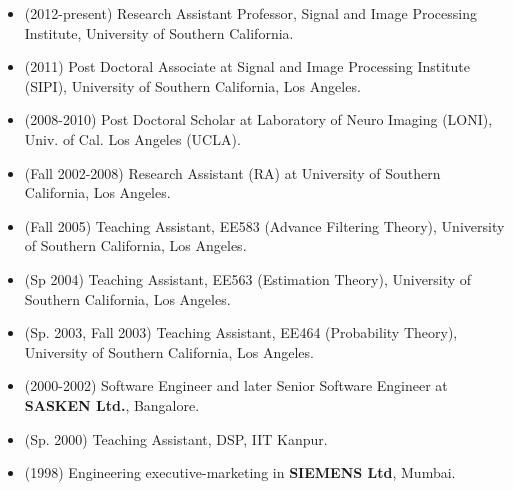 \documentclass[overlapped,line,letterpaper]{res}
\begin{document}
\begin{resume}
\begin{itemize}
\item (2012-present) Research Assistant Professor, Signal and Image Processing Institute, University of Southern California. 
\item (2011) Post Doctoral Associate at Signal and Image Processing Institute (SIPI), University of Southern California, Los Angeles.
\item (2008-2010) Post Doctoral Scholar at Laboratory of Neuro Imaging (LONI), Univ. of Cal. Los Angeles (UCLA).
\item (Fall 2002-2008) Research Assistant (RA) at University of Southern California, Los Angeles.
\item (Fall 2005) Teaching Assistant, EE583 (Advance Filtering Theory), University of Southern California, Los Angeles.
\item (Sp 2004) Teaching Assistant, EE563 (Estimation Theory), University of Southern California, Los Angeles.
\item (Sp. 2003, Fall 2003) Teaching Assistant, EE464 (Probability Theory), University of Southern California, Los Angeles.
\item (2000-2002) Software Engineer and later Senior Software Engineer at \textbf{SASKEN Ltd.}, Bangalore.
\item (Sp. 2000) Teaching Assistant, DSP, IIT Kanpur.
\item (1998) Engineering executive-marketing in \textbf{SIEMENS Ltd}, Mumbai.


\end{itemize}
\end{resume}
\end{document}
